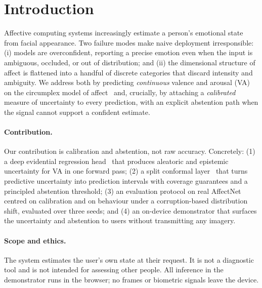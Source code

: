 \section{Introduction}

Affective computing systems increasingly estimate a person's emotional state
from facial appearance. Two failure modes make naive deployment irresponsible:
(i) models are overconfident, reporting a precise emotion even when the input is
ambiguous, occluded, or out of distribution; and (ii) the dimensional structure
of affect is flattened into a handful of discrete categories that discard
intensity and ambiguity. We address both by predicting \emph{continuous} valence
and arousal (VA) on the circumplex model of affect~\cite{russell1980circumplex}
and, crucially, by attaching a \emph{calibrated} measure of uncertainty to every
prediction, with an explicit abstention path when the signal cannot support a
confident estimate.

\paragraph{Contribution.} Our contribution is calibration and abstention, not raw
accuracy. Concretely: (1) a deep evidential regression head~\cite{amini2020evidential}
that produces aleatoric and epistemic uncertainty for VA in one forward pass;
(2) a split conformal layer~\cite{vovk2005algorithmic} that turns predictive
uncertainty into prediction intervals with coverage guarantees and a principled
abstention threshold; (3) an evaluation protocol on real
AffectNet~\cite{mollahosseini2017affectnet} centred on calibration and on
behaviour under a corruption-based distribution shift, evaluated over three
seeds; and (4) an on-device demonstrator that surfaces
the uncertainty and abstention to users without transmitting any imagery.

\paragraph{Scope and ethics.} The system estimates the user's own state at their
request. It is not a diagnostic tool and is not intended for assessing other
people. All inference in the demonstrator runs in the browser; no frames or
biometric signals leave the device.

